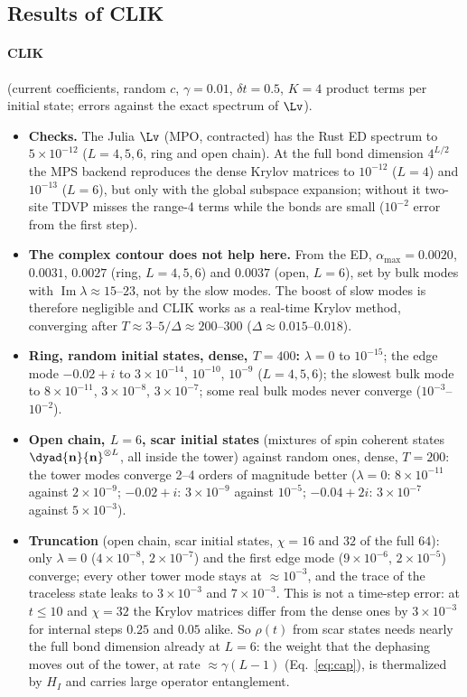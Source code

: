 \subsection{Results of CLIK}
\label{sec:tn-results}

\paragraph{CLIK} (current coefficients, random $c$, $\gamma = 0.01$, $\delta t = 0.5$, $K = 4$ product terms per initial state; errors against the exact spectrum of $\Lv$).
\begin{itemize}
\item \textbf{Checks.} The Julia $\Lv$ (MPO, contracted) has the Rust ED spectrum to $5\times10^{-12}$ ($L = 4, 5, 6$, ring and open chain). At the full bond dimension $4^{L/2}$ the MPS backend reproduces the dense Krylov matrices to $10^{-12}$ ($L = 4$) and $10^{-13}$ ($L = 6$), but only with the global subspace expansion; without it two-site TDVP misses the range-4 terms while the bonds are small ($10^{-2}$ error from the first step).
\item \textbf{The complex contour does not help here.} From the ED, $\alpha_{\max} = 0.0020$, $0.0031$, $0.0027$ (ring, $L = 4, 5, 6$) and $0.0037$ (open, $L = 6$), set by bulk modes with $\operatorname{Im}\lambda \approx 15$--$23$, not by the slow modes. The boost of slow modes is therefore negligible and CLIK works as a real-time Krylov method, converging after $T \approx 3$--$5/\Delta \approx 200$--$300$ ($\Delta \approx 0.015$--$0.018$).
\item \textbf{Ring, random initial states, dense, $T = 400$:} $\lambda = 0$ to $10^{-15}$; the edge mode $-0.02 + i$ to $3\times10^{-14}$, $10^{-10}$, $10^{-9}$ ($L = 4, 5, 6$); the slowest bulk mode to $8\times10^{-11}$, $3\times10^{-8}$, $3\times10^{-7}$; some real bulk modes never converge ($10^{-3}$--$10^{-2}$).
\item \textbf{Open chain, $L = 6$, scar initial states} (mixtures of spin coherent states $\dyad{\mathbf n}{\mathbf n}^{\otimes L}$, all inside the tower) against random ones, dense, $T = 200$: the tower modes converge 2--4 orders of magnitude better ($\lambda = 0$: $8\times10^{-11}$ against $2\times10^{-9}$; $-0.02 + i$: $3\times10^{-9}$ against $10^{-5}$; $-0.04 + 2i$: $3\times10^{-7}$ against $5\times10^{-3}$).
\item \textbf{Truncation} (open chain, scar initial states, $\chi = 16$ and $32$ of the full $64$): only $\lambda = 0$ ($4\times10^{-8}$, $2\times10^{-7}$) and the first edge mode ($9\times10^{-6}$, $2\times10^{-5}$) converge; every other tower mode stays at $\approx10^{-3}$, and the trace of the traceless state leaks to $3\times10^{-3}$ and $7\times10^{-3}$. This is not a time-step error: at $t \le 10$ and $\chi = 32$ the Krylov matrices differ from the dense ones by $3\times10^{-3}$ for internal steps $0.25$ and $0.05$ alike. So $\rho(t)$ from scar states needs nearly the full bond dimension already at $L = 6$: the weight that the dephasing moves out of the tower, at rate $\approx\gamma(L-1)$ (Eq.~\eqref{eq:cap}), is thermalized by $H_I$ and carries large operator entanglement.
\end{itemize}


